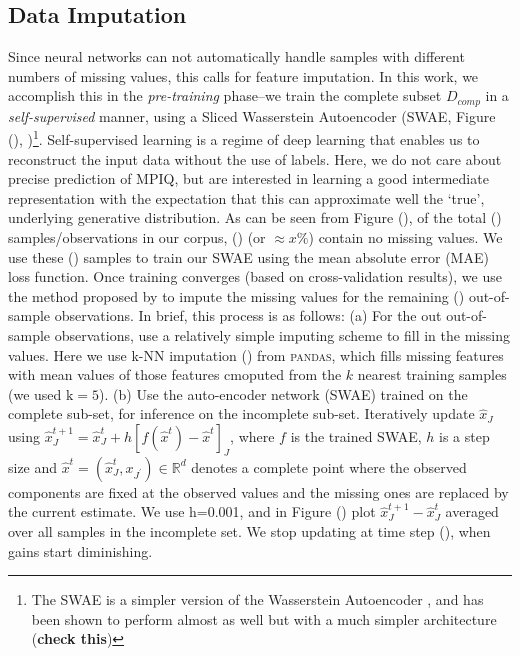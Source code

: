 \subsection{Data Imputation}\label{sec:DL_imputation}
Since neural networks can not automatically handle samples with different numbers of missing values, this calls for feature imputation. In this work, we accomplish this in the \emph{pre-training} phase--we train the complete subset $D_{comp}$ in a \emph{self-supervised} manner, using a Sliced Wasserstein Autoencoder (SWAE, Figure (), \cite{sliced_wasserstein_autoencoder_swae})\footnote{The SWAE is a simpler version of the Wasserstein Autoencoder \citep{wasserstein_autoencoder}, and has been shown to perform almost as well but with a much simpler architecture (\textbf{check this})}. Self-supervised learning is a regime of deep learning that enables us to reconstruct the input data without the use of labels. Here, we do not care about precise prediction of MPIQ, but are interested in learning a good intermediate representation with the expectation that this can approximate well the `true', underlying generative distribution. As can be seen from Figure (), of the total () samples/observations in our corpus, () (or $\approx x \%$) contain no missing values. We use these () samples to train our SWAE using the mean absolute error (MAE) loss function. Once training converges (based on cross-validation results), we use the method proposed by \cite{autoencoder_imputation} to impute the missing values for the remaining () out-of-sample observations. In brief, this process is as follows: (a) For the out out-of-sample observations, use a relatively simple imputing scheme to fill in the missing values. Here we use k-NN imputation () from \textsc{pandas}, which fills missing features with mean values of those features cmoputed from the $k$ nearest training samples (we used $\text{k} = 5$). (b) Use the auto-encoder network (SWAE) trained on the complete sub-set, for inference on the incomplete sub-set. Iteratively update $\hat{x}_{J}$ using $\hat{x}_{J}^{t+1}=\hat{x}_{J}^{t}+h\left[f\left(\hat{x}^{t}\right)-\hat{x}^{t}\right]_{J}$, where $f$ is the trained SWAE, $h$ is a step size and $\hat{x}^{t}=\left(\hat{x}_{J}^{t}, x_{J^{\prime}}\right) \in \mathbb{R}^{d}$ denotes a complete point where the observed components are fixed at the observed values and the missing ones are replaced by the current estimate. We use h=0.001, and in Figure () plot $\hat{x}_{J}^{t+1} - \hat{x}_{J}^{t}$ averaged over all samples in the incomplete set. We stop updating at time step (), when gains start diminishing.%

